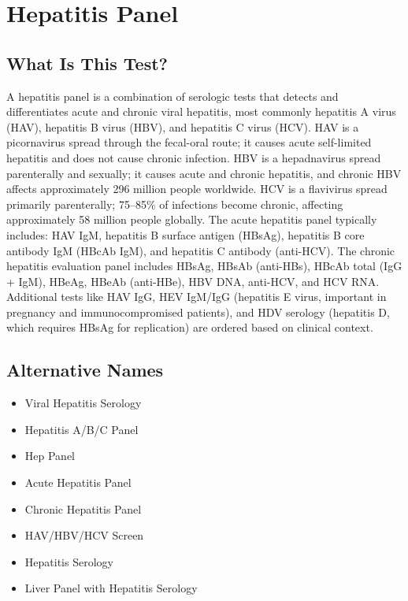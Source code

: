 \chapter{Hepatitis Panel}

\section*{What Is This Test?}
A hepatitis panel is a combination of serologic tests that detects and differentiates acute and chronic viral hepatitis, most commonly hepatitis A virus (HAV), hepatitis B virus (HBV), and hepatitis C virus (HCV). HAV is a picornavirus spread through the fecal-oral route; it causes acute self-limited hepatitis and does not cause chronic infection. HBV is a hepadnavirus spread parenterally and sexually; it causes acute and chronic hepatitis, and chronic HBV affects approximately 296 million people worldwide. HCV is a flavivirus spread primarily parenterally; 75--85\% of infections become chronic, affecting approximately 58 million people globally. The acute hepatitis panel typically includes: HAV IgM, hepatitis B surface antigen (HBsAg), hepatitis B core antibody IgM (HBcAb IgM), and hepatitis C antibody (anti-HCV). The chronic hepatitis evaluation panel includes HBsAg, HBsAb (anti-HBs), HBcAb total (IgG + IgM), HBeAg, HBeAb (anti-HBe), HBV DNA, anti-HCV, and HCV RNA. Additional tests like HAV IgG, HEV IgM/IgG (hepatitis E virus, important in pregnancy and immunocompromised patients), and HDV serology (hepatitis D, which requires HBsAg for replication) are ordered based on clinical context.

\section*{Alternative Names}
\begin{itemize}
  \item Viral Hepatitis Serology
  \item Hepatitis A/B/C Panel
  \item Hep Panel
  \item Acute Hepatitis Panel
  \item Chronic Hepatitis Panel
  \item HAV/HBV/HCV Screen
  \item Hepatitis Serology
  \item Liver Panel with Hepatitis Serology
\end{itemize}
